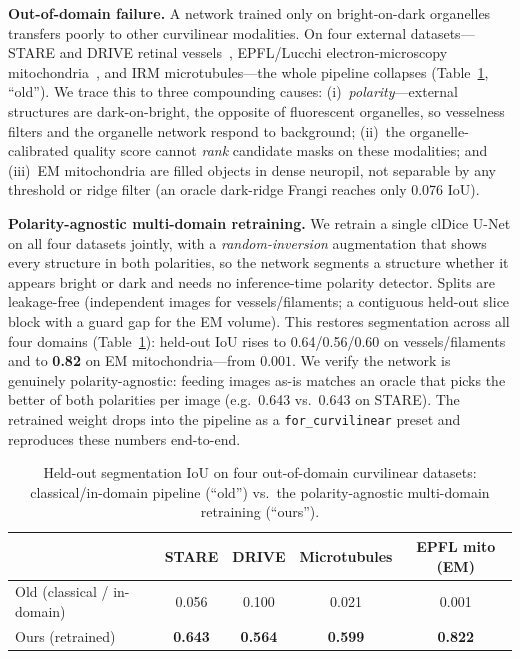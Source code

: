 \documentclass[runningheads]{llncs}
\begin{document}
\noindent\textbf{Out-of-domain failure.} A network trained only on
bright-on-dark organelles transfers poorly to other curvilinear modalities. On
four external datasets---STARE and DRIVE retinal vessels~\cite{stare,drive},
EPFL/Lucchi electron-microscopy mitochondria~\cite{lucchi}, and IRM
microtubules---the whole pipeline collapses (Table~\ref{tab:retrain}, ``old'').
We trace this to three compounding causes: (i)~\emph{polarity}---external
structures are dark-on-bright, the opposite of fluorescent organelles, so
vesselness filters and the organelle network respond to background; (ii)~the
organelle-calibrated quality score cannot \emph{rank} candidate masks on these
modalities; and (iii)~EM mitochondria are filled objects in dense neuropil, not
separable by any threshold or ridge filter (an oracle dark-ridge Frangi reaches
only 0.076 IoU).

\noindent\textbf{Polarity-agnostic multi-domain retraining.} We retrain a single
clDice U-Net on all four datasets jointly, with a \emph{random-inversion}
augmentation that shows every structure in both polarities, so the network
segments a structure whether it appears bright or dark and needs no
inference-time polarity detector. Splits are leakage-free (independent images
for vessels/filaments; a contiguous held-out slice block with a guard gap for
the EM volume). This restores segmentation across all four domains
(Table~\ref{tab:retrain}): held-out IoU rises to 0.64/0.56/0.60 on
vessels/filaments and to \textbf{0.82} on EM mitochondria---from $0.001$. We
verify the network is genuinely polarity-agnostic: feeding images as-is matches
an oracle that picks the better of both polarities per image (e.g.\ 0.643 vs.\
0.643 on STARE). The retrained weight drops into the pipeline as a
\texttt{for\_curvilinear} preset and reproduces these numbers end-to-end.

\begin{table}[t]
\centering
\caption{Held-out segmentation IoU on four out-of-domain curvilinear datasets:
classical/in-domain pipeline (``old'') vs.\ the polarity-agnostic multi-domain
retraining (``ours'').}
\label{tab:retrain}
\setlength{\tabcolsep}{7pt}
\begin{tabular}{lcccc}
\toprule
 & STARE & DRIVE & Microtubules & EPFL mito (EM)\\
\midrule
Old (classical / in-domain) & 0.056 & 0.100 & 0.021 & 0.001\\
Ours (retrained)            & \textbf{0.643} & \textbf{0.564} & \textbf{0.599} & \textbf{0.822}\\
\bottomrule
\end{tabular}
\end{table}
\end{document}
